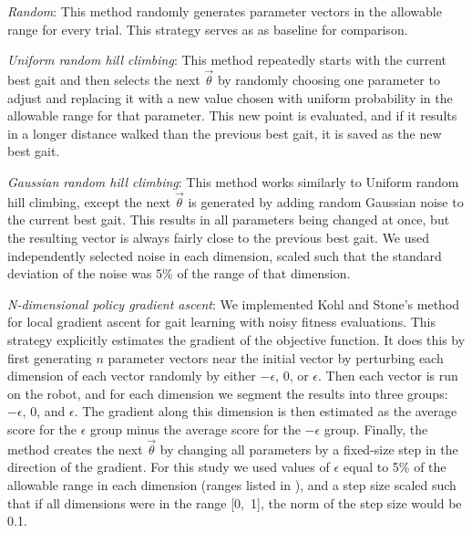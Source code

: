 


\emph{Random}: This method randomly generates parameter vectors in the allowable range for every trial.  This strategy serves as as baseline for comparison.

\emph{Uniform random hill climbing}: This method repeatedly starts
  with the current best gait and then selects the next $\vec{\theta}$ by
  randomly choosing one parameter to adjust and replacing it with a
  new value chosen with uniform probability in the allowable range for
  that parameter. This new point is evaluated, and if it results in a
  longer distance walked than the previous best gait, it is saved as
  the new best gait.

\emph{Gaussian random hill climbing}: This method works
  similarly to Uniform random hill climbing, except the next
  $\vec{\theta}$ is generated by adding random Gaussian noise to the
  current best gait.  This results in all parameters being changed at
  once, but the resulting vector is always fairly close to the
  previous best gait.  We used independently selected noise in each
  dimension, scaled such that the standard deviation of the noise was
  5\% of the range of that dimension.

\emph{N-dimensional policy gradient ascent}: We implemented Kohl
  and Stone's \citep{kohl} method for local gradient ascent for gait
  learning with noisy fitness evaluations. This strategy explicitly
  estimates the gradient of the objective function. It does this by
  first generating $n$ parameter vectors near the initial vector by
  perturbing each dimension of each vector randomly by either
  $-\epsilon$, $0$, or $\epsilon$. Then each vector is run on the
  robot, and for each dimension we segment the results into three
  groups: $-\epsilon$, $0$, and $\epsilon$.  The gradient along this
  dimension is then estimated as the average score for the $\epsilon$
  group minus the average score for the $-\epsilon$ group. Finally,
  the method creates the next $\vec{\theta}$ by changing all
  parameters by a fixed-size step in the direction of the gradient.
  For this study we used values of $\epsilon$ equal to 5\% of the
  allowable range in each dimension (ranges listed in
  ), and a step size scaled such that if all dimensions
  were in the range [0,~1], the norm of the step size would be 0.1.


